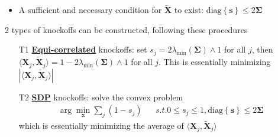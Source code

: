 \documentclass[twoside]{article}
\begin{document}
\begin{itemize}
\begin{itemize}
        \item A sufficient and necessary condition for $\tilde{\mathbf{X}}$ to exist: $\mathrm{diag}\left\{\mathbf{s}\right\} \leq 2\boldsymbol{\Sigma}$
    \end{itemize}
    2 types of knockoffs can be constructed, following these procedures
    \begin{itemize}
        \item[T1] \underline{\textbf{Equi-correlated}} knockoffs: set $s_j=2\lambda_{\min}(\boldsymbol{\Sigma}) \wedge 1$ for all $j$, then $\langle \mathbf{X}_j,\tilde{\mathbf{X}}_j \rangle = 1-2\lambda_{\min}(\boldsymbol{\Sigma}) \wedge 1$ for all $j$. This is essentially minimizing $\left\vert \langle \mathbf{X}_j,\tilde{\mathbf{X}}_j \rangle \right\vert$ 
        \item[T2] \underline{\textbf{SDP}} knockoffs: solve the convex problem \begin{align*}
            \arg\min_{\mathbf{x}} \sum_j (1-s_j) & & s.t. 0 \leq s_j \leq 1, \mathrm{diag}\left\{ \mathbf{s}\right\}\leq 2\boldsymbol{\Sigma}
        \end{align*}
        which is essentially minimizing the average of $ \langle \mathbf{X}_j,\tilde{\mathbf{X}}_j \rangle $ 
    \end{itemize}
\end{itemize}
\end{document}

